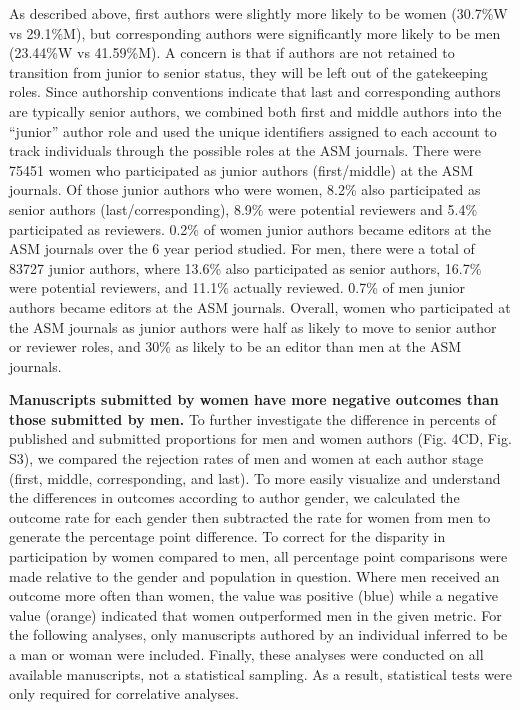 \documentclass[11pt,]{article}
\begin{document}
As described above, first authors were slightly more likely to be women
(30.7\%W vs 29.1\%M), but corresponding authors were significantly more
likely to be men (23.44\%W vs 41.59\%M). A concern is that if authors
are not retained to transition from junior to senior status, they will
be left out of the gatekeeping roles. Since authorship conventions
indicate that last and corresponding authors are typically senior
authors, we combined both first and middle authors into the ``junior''
author role and used the unique identifiers assigned to each account to
track individuals through the possible roles at the ASM journals. There
were 75451 women who participated as junior authors (first/middle) at
the ASM journals. Of those junior authors who were women, 8.2\% also
participated as senior authors (last/corresponding), 8.9\% were
potential reviewers and 5.4\% participated as reviewers. 0.2\% of women
junior authors became editors at the ASM journals over the 6 year period
studied. For men, there were a total of 83727 junior authors, where
13.6\% also participated as senior authors, 16.7\% were potential
reviewers, and 11.1\% actually reviewed. 0.7\% of men junior authors
became editors at the ASM journals. Overall, women who participated at
the ASM journals as junior authors were half as likely to move to senior
author or reviewer roles, and 30\% as likely to be an editor than men at
the ASM journals.

\textbf{Manuscripts submitted by women have more negative outcomes than
those submitted by men.} To further investigate the difference in
percents of published and submitted proportions for men and women
authors (Fig. 4CD, Fig. S3), we compared the rejection rates of men and
women at each author stage (first, middle, corresponding, and last). To
more easily visualize and understand the differences in outcomes
according to author gender, we calculated the outcome rate for each
gender then subtracted the rate for women from men to generate the
percentage point difference. To correct for the disparity in
participation by women compared to men, all percentage point comparisons
were made relative to the gender and population in question. Where men
received an outcome more often than women, the value was positive (blue)
while a negative value (orange) indicated that women outperformed men in
the given metric. For the following analyses, only manuscripts authored
by an individual inferred to be a man or woman were included. Finally,
these analyses were conducted on all available manuscripts, not a
statistical sampling. As a result, statistical tests were only required
for correlative analyses.
\end{document}
